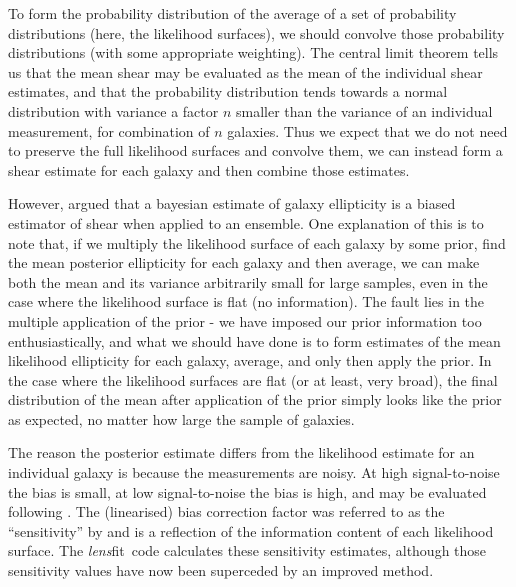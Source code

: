 \documentclass{article}
\def\lensfitsuite{{\em lens}fit\ }
\begin{document}
To form the probability distribution of the average of a set of probability distributions 
(here, the likelihood surfaces), we should convolve those 
probability distributions (with some appropriate weighting).  The central limit theorem tells us that the
mean shear may be evaluated as the mean of the individual shear estimates, and that the probability 
distribution tends towards a normal distribution with variance a factor $n$ smaller than the variance of
an individual measurement, for combination of $n$ galaxies.  Thus we expect that we do not need to preserve
the full likelihood surfaces and convolve them, we can instead form a shear estimate for each galaxy and then
combine those estimates.

However, \citet{miller07a} argued that a bayesian estimate of galaxy ellipticity is a biased estimator of
shear when applied to an ensemble.  One explanation of this is to note that, if we multiply the likelihood
surface of each galaxy by some prior, find the mean posterior ellipticity for each galaxy and then average,
we can make both the mean and its variance arbitrarily small for large samples, even in the case where the
likelihood surface is flat (no information).  The fault lies in the multiple application of the prior - we
have imposed our prior information too enthusiastically, and what we should have done is to form estimates
of the mean likelihood ellipticity for each galaxy, average, and only then apply the prior.  In the case where
the likelihood surfaces are flat (or at least, very broad), the final distribution of the mean after
application of the prior simply looks like the prior as expected, no matter how large the sample of galaxies.

The reason the posterior estimate differs from the likelihood estimate for an individual galaxy is because the
measurements are noisy.  At high signal-to-noise the bias is small, at low signal-to-noise the bias is high,
and may be evaluated following \citet{miller07a}.  The (linearised) bias correction factor was referred to
as the ``sensitivity'' by \citeauthor{miller07a} and is a reflection of the information content of each
likelihood surface.  The \lensfitsuite code calculates these sensitivity estimates, although those
sensitivity values have now been superceded by an improved method.
\end{document}
